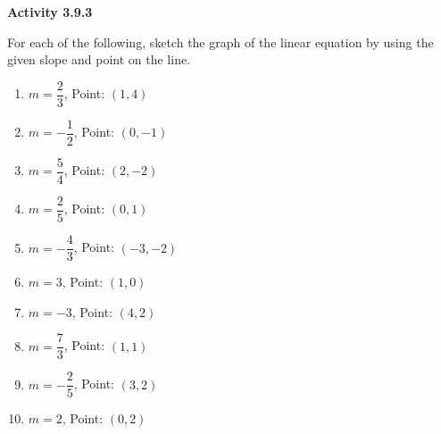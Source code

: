  \vspace{1ex}
\noindent\textbf{Activity 3.9.3}

\vspace{0.75ex}


For each of the following, sketch the graph of the linear equation by using the given slope and point on the line.

\begin{multicols}{2}
\begin{enumerate}[noitemsep, label = \color{blue}\arabic*. ]
    \item $m = \dfrac{2}{3}$, Point: $(1, 4)$
    \item $m = -\dfrac{1}{2}$, Point: $(0, -1)$
    \item $m = \dfrac{5}{4}$, Point: $(2, -2)$
    \item $m = \dfrac{2}{5}$, Point: $(0, 1)$
    \item $m = -\dfrac{4}{3}$, Point: $(-3, -2)$
    \item $m = 3$, Point: $(1, 0)$
    \item $m = -3$, Point: $(4, 2)$
    \item $m = \dfrac{7}{3}$, Point: $(1, 1)$
    \item $m = -\dfrac{2}{5}$, Point: $(3, 2)$
    \item $m = 2$, Point: $(0, 2)$
\end{enumerate}
\end{multicols}
